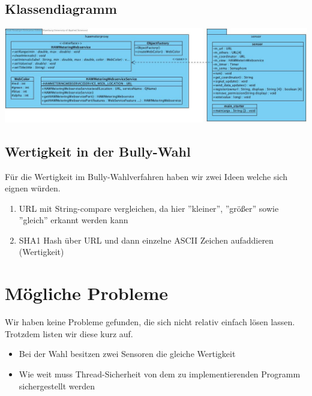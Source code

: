 \documentclass{article}
\begin{document}
\newpage
\subsection{Klassendiagramm}
\includegraphics[scale=.35]{documents/classdiagram}

\subsection{Wertigkeit in der Bully-Wahl}
Für die Wertigkeit im Bully-Wahlverfahren haben wir zwei Ideen welche sich eignen würden.
\begin{enumerate}
	\item URL mit String-compare vergleichen, da hier ''kleiner'', ''größer'' sowie ''gleich'' erkannt werden kann
	\item SHA1 Hash über URL und dann einzelne ASCII Zeichen aufaddieren (Wertigkeit)
\end{enumerate}

\section{Mögliche Probleme}
Wir haben keine Probleme gefunden, die sich nicht relativ einfach lösen lassen. Trotzdem listen wir diese kurz auf.
\begin{itemize}
	\item Bei der Wahl besitzen zwei Sensoren die gleiche Wertigkeit
	\item Wie weit muss Thread-Sicherheit von dem zu implementierenden Programm sichergestellt werden
\end{itemize}
\end{document}
